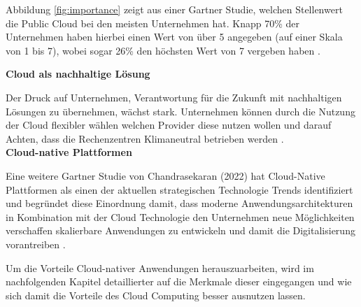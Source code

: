 Abbildung \ref{fig:importance} zeigt aus einer Gartner Studie, welchen Stellenwert die Public Cloud bei den meisten Unternehmen hat. Knapp 70\% der Unternehmen haben hierbei einen Wert von über 5 angegeben (auf einer Skala von 1 bis 7), wobei sogar 26\% den höchsten Wert von 7 vergeben haben \cite[Vgl.][S. 2]{Ganly2022}. \pagebreak

\textbf{Cloud als nachhaltige Lösung}

Der Druck auf Unternehmen, Verantwortung für die Zukunft mit nachhaltigen Lösungen zu übernehmen, wächst stark. Unternehmen können durch die Nutzung der Cloud flexibler wählen welchen Provider diese nutzen wollen und darauf Achten, dass die Rechenzentren Klimaneutral betrieben werden \cite[Vgl.][S. 24ff]{Illsley2022}. \\

\textbf{Cloud-native Plattformen}

Eine weitere Gartner Studie von Chandrasekaran (2022) hat Cloud-Native Plattformen als einen der aktuellen strategischen Technologie Trends identifiziert und begründet diese Einordnung damit, dass moderne Anwendungsarchitekturen in Kombination mit der Cloud Technologie den Unternehmen neue Möglichkeiten verschaffen skalierbare Anwendungen zu entwickeln und damit die Digitalisierung vorantreiben \cite[Vgl][S. 12]{Chandrasekaran2022}. 

Um die Vorteile Cloud-nativer Anwendungen herauszuarbeiten, wird im nachfolgenden Kapitel detaillierter auf die Merkmale dieser eingegangen und wie sich damit die Vorteile des Cloud Computing besser ausnutzen lassen. \pagebreak